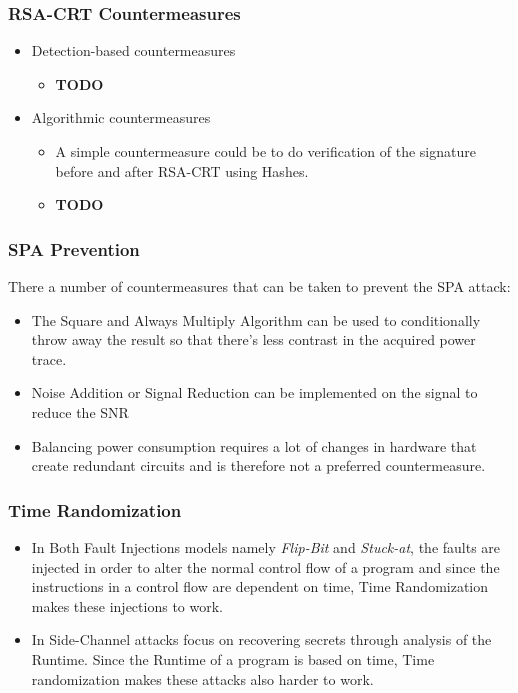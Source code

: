 \documentclass[1p,16pt]{elsarticle}
\begin{document}
\subsubsection{RSA-CRT Countermeasures}%
\label{sub:rsa_crt_countermeasures}
\begin{itemize}
	\item Detection-based countermeasures
		\begin{itemize}
			\item \textbf{TODO}
		\end{itemize}
	\item Algorithmic countermeasures
		\begin{itemize}
			\item A simple countermeasure could be to do verification of the signature before and after
				RSA-CRT using Hashes.
			\item \textbf{TODO}
		\end{itemize}
\end{itemize}

\subsubsection{SPA Prevention}%
\label{sub:spa_prevention}
There a number of countermeasures that can be taken to prevent the SPA attack:
\begin{itemize}
	\item The Square and Always Multiply Algorithm can be used to conditionally throw away the result
		so that there's less contrast in the acquired power trace.
	\item Noise Addition or Signal Reduction can be implemented on the signal to reduce the SNR
	\item Balancing power consumption requires a lot of changes in hardware that create redundant circuits
		and is therefore not a preferred countermeasure.
\end{itemize}

\subsubsection{Time Randomization}%
\label{ssub:time_randomization}
\begin{itemize}
	\item In Both Fault Injections models namely \textit{Flip-Bit} and \textit{Stuck-at},
		the faults are injected in order to alter the normal control flow of a program
		and since the instructions in a control flow are dependent on time, Time Randomization
		makes these injections to work.
	\item In Side-Channel attacks focus on recovering secrets through analysis of the Runtime.
		Since the Runtime of a program is based on time, Time randomization makes these attacks
		also harder to work.
\end{itemize}
\end{document}
